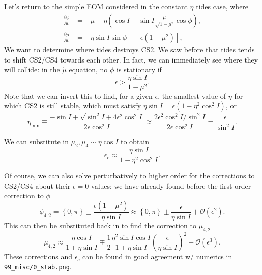 \documentclass[11pt,
        usenames, %
        dvipsnames %
    ]{article}
\newcommand*{\pd}[2]{\frac{\partial#1}{\partial#2}}
\newcommand*{\p}[1]{\left(#1\right)}
\newcommand*{\s}[1]{\left[#1\right]}
\newcommand*{\z}[1]{\left\{#1\right\}}
\begin{document}
Let's return to the simple EOM considered in the constant $\eta$ tides case,
where
\begin{align}
    \pd{\phi}{t} &= -\mu + \eta\p{\cos I + \sin I \frac{\mu}{\sqrt{1 - \mu^2}}
        \cos \phi} ,\\
    \pd{\mu}{t} &= -\eta \sin I \sin \phi + \s{\epsilon \p{1 - \mu^2}},
\end{align}
We want to determine where tides destroys CS2. We saw before that tides tends to
shift CS2/CS4 towards each other. In fact, we can immediately see where they
will collide: in the $\dot{\mu}$ equation, no $\phi$ is stationary if
\begin{equation}
    \epsilon > \frac{\eta \sin I}{1 - \mu^2}.
\end{equation}
Note that we can invert this to find, for a given $\epsilon$, the smallest value
of $\eta$ for which CS2 is still stable, which must satisfy $\eta \sin I =
\epsilon\p{1 - \eta^2\cos^2 I}$, or
\begin{equation}
    \eta_{\min} \equiv \frac{-\sin I + \sqrt{\sin^2I
            + 4\epsilon^2 \cos^2 I}}{2\epsilon \cos^2 I}
        \approx \frac{2\epsilon^2 \cos^2 I / \sin^2 I}{
            2\epsilon \cos^2 I}
        = \frac{\epsilon}{\sin^2 I}.
\end{equation}

We can substitute in $\mu_2, \mu_4 \sim \eta \cos I$ to obtain
\begin{equation}
    \epsilon_{c} \approx \frac{\eta \sin I}{1 - \eta^2\cos^2 I}.
\end{equation}

Of course, we can also solve perturbatively to higher order for the corrections
to CS2/CS4 about their $\epsilon = 0$ values; we have already found before the
first order correction to $\phi$
\begin{equation}
    \phi_{4, 2} = \z{0, \pi} \pm \frac{\epsilon\p{1 - \mu^2}}{\eta \sin I}
        \approx \z{0, \pi} \pm \frac{\epsilon}{\eta \sin I} +
        \mathcal{O}\p{\epsilon^2}.
\end{equation}
This can then be substituted back in to find the correction to $\mu_{4, 2}$
\begin{equation}
    \mu_{4, 2} \approx \frac{\eta \cos I}{1 \mp \eta \sin I}
        \mp \frac{1}{2}\frac{\eta^2 \sin I \cos I}{1 \mp \eta \sin I}
            \p{\frac{\epsilon}{\eta \sin I}}^2 + \mathcal{O}\p{\epsilon^3}.
\end{equation}
These corrections and $\epsilon_c$ can be found in good agreement w/ numerics in
\lstinline{99_misc/0_stab.png}.
\end{document}
